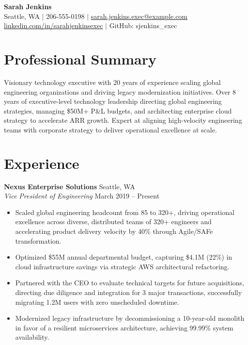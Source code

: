 \documentclass[11pt,letterpaper]{article}
\begin{document}
\begin{center}
    {\LARGE \textbf{Sarah Jenkins}} \\
    Seattle, WA $|$ 206-555-0198 $|$ \href{mailto:sarah.jenkins.exec@example.com}{sarah.jenkins.exec@example.com} \\
    \href{https://linkedin.com/in/sarahjenkinsexec}{linkedin.com/in/sarahjenkinsexec} $|$ GitHub: sjenkins\_exec
\end{center}

\section{Professional Summary}
Visionary technology executive with 20 years of experience scaling global engineering organizations and driving legacy modernization initiatives. Over 8 years of executive-level technology leadership directing global engineering strategies, managing \$50M+ P\&L budgets, and architecting enterprise cloud strategy to accelerate ARR growth. Expert at aligning high-velocity engineering teams with corporate strategy to deliver operational excellence at scale.

\section{Experience}
\textbf{Nexus Enterprise Solutions} \hfill Seattle, WA \\
\textit{Vice President of Engineering} \hfill March 2019 -- Present
\begin{itemize}
    \item Scaled global engineering headcount from 85 to 320+, driving operational excellence across diverse, distributed teams of 320+ engineers and accelerating product delivery velocity by 40\% through Agile/SAFe transformation.
    \item Optimized \$55M annual departmental budget, capturing \$4.1M (22\%) in cloud infrastructure savings via strategic AWS architectural refactoring.
    \item Partnered with the CEO to evaluate technical targets for future acquisitions, directing due diligence and integration for 3 major transactions, successfully migrating 1.2M users with zero unscheduled downtime.
    \item Modernized legacy infrastructure by decommissioning a 10-year-old monolith in favor of a resilient microservices architecture, achieving 99.99\% system availability.
\end{itemize}
\end{document}

